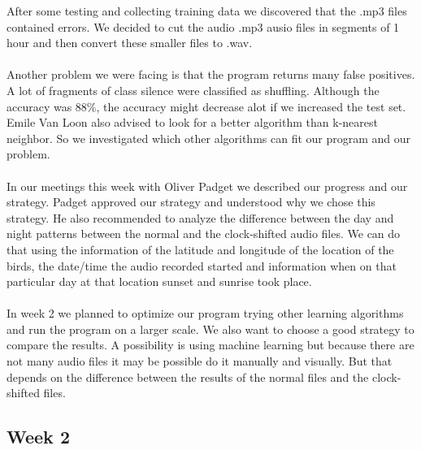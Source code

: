 \documentclass[a4paper]{article}
\begin{document}
After some testing and collecting training data we discovered that the .mp3 files contained errors. We decided to cut the audio .mp3 ausio files in segments of 1 hour and then convert these smaller files to .wav.\\\\
Another problem we were facing is that the program returns many false positives. A lot of fragments of class silence were classified as shuffling. Although the accuracy was 88\%, the accuracy might decrease alot if we increased the test set. Emile Van Loon also advised to look for a better algorithm than k-nearest neighbor. So we investigated which other algorithms can fit our program and our problem.\\\\
In our meetings this week with Oliver Padget we described our progress and our strategy. Padget approved our strategy and understood why we chose this strategy. He also recommended to analyze the difference between the day and night patterns between the normal and the clock-shifted audio files. We can do that using the information of the latitude and longitude of the location of the birds, the date/time the audio recorded started and information when on that particular day at that location sunset and sunrise took place.\\\\
In week 2 we planned to optimize our program trying other learning algorithms and run the program on a larger scale. We also want to choose a good strategy to compare the results. A possibility is using machine learning but because there are not many audio files it may be possible do it manually and visually. But that depends on the difference between the results of the normal files and the clock-shifted files. 

\subsection*{Week 2}
\end{document}
